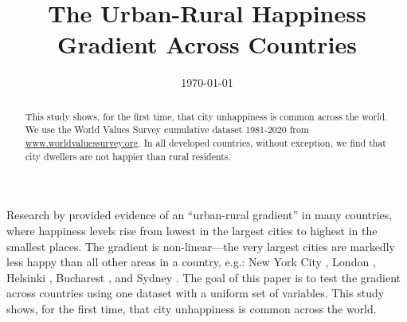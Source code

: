 \documentclass[11pt, letterpaper]{article}
\date{{}\today  \hspace{.2in}\xxivtime}
\title{  %
The Urban-Rural Happiness Gradient Across Countries%
}
\author{
}
\begin{document}


\maketitle
\vspace{-.4in}
\begin{center}

\end{center}


\begin{abstract}
\noindent This study shows, for the first time, that city unhappiness is 
common across the world. We use the World Values Survey cumulative dataset
1981-2020 from \url{www.worldvaluessurvey.org}. 
In all developed countries, %
 without exception, we find that city dwellers are not happier than rural
residents.  
\end{abstract}
\vspace{.15in} 
\vspace{.25in} 

Research by \cite{aok11a} provided evidence of an ``urban-rural gradient'' in many countries, where happiness levels rise from lowest in the largest cities to highest in the smallest places. The gradient is non-linear---the very largest cities are markedly less happy than all other areas in a country, e.g.: New York City \citep{aok_brfss_city_cize16,senior_ny_sep16_14}, London \citep{ons11,ibt13}, Helsinki \citep{morrison15}, Bucharest \citep{lenzi16D}, and Sydney \citep[cited in][]{morrison11}.
The goal of this paper is to test the gradient across countries using one dataset with a uniform set of variables. This study shows, for the first time, that city unhappiness is common across the world.%
 
\end{document}
